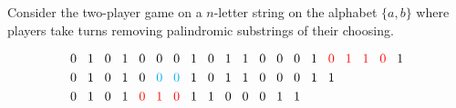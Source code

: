 \documentclass{article}
\begin{document}
Consider the two-player game on a $n$-letter string on the alphabet $\{a,b\}$
where players take turns removing palindromic substrings of their choosing.
\begin{figure}[ht!]
  \Huge
  \begin{align*}
    &0 \hspace{3mm} 1 \hspace{3mm} 0 \hspace{3mm} 1 \hspace{3mm} 0 \hspace{3mm} 0 \hspace{3mm} 0 \hspace{3mm} 1 \hspace{3mm} 0 \hspace{3mm} 1 \hspace{3mm} 1 \hspace{3mm} 0 \hspace{3mm} 0 \hspace{3mm} 0 \hspace{3mm} 1 \hspace{3mm} {\color{red} 0 \hspace{3mm} 1 \hspace{3mm} 1 \hspace{3mm} 0} \hspace{3mm} 1 \\
    &0 \hspace{3mm} 1 \hspace{3mm} 0 \hspace{3mm} 1 \hspace{3mm} 0 \hspace{3mm} {\color{cyan} 0 \hspace{3mm} 0} \hspace{3mm} 1 \hspace{3mm} 0 \hspace{3mm} 1 \hspace{3mm} 1 \hspace{3mm} 0 \hspace{3mm} 0 \hspace{3mm} 0 \hspace{3mm} 1 \hspace{3mm} 1 \\
    &0 \hspace{3mm} 1 \hspace{3mm} 0 \hspace{3mm} 1 \hspace{3mm} {\color{red} 0 \hspace{3mm} 1 \hspace{3mm} 0} \hspace{3mm} 1 \hspace{3mm} 1 \hspace{3mm} 0 \hspace{3mm} 0 \hspace{3mm} 0 \hspace{3mm} 1 \hspace{3mm} 1 \\

\end{align*}
\end{figure}
\end{document}
